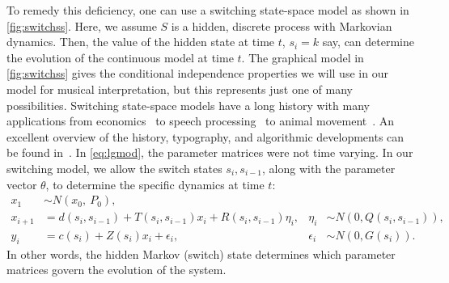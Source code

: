 \documentclass[12pt]{article}
\begin{document}
To remedy this deficiency, one can use a switching state-space
model as shown in \autoref{fig:switchss}. Here, we assume $S$ is a
hidden, discrete process with Markovian dynamics. Then, the value of
the hidden state at time $t$, $s_i=k$ say, can determine the evolution of
the continuous model at time $t$. The graphical model in
\autoref{fig:switchss} gives the conditional independence properties
we will use in our model for musical interpretation, but this
represents just one of many possibilities. Switching state-space models have a long
history with many applications from
economics~\citep{KimNelson1998,Kim1994,Hamilton2011} to speech
processing~\citep{FoxSudderth2011} to animal
movement~\citep{PattersonThomas2008,BlockJonsen2011}. An excellent
overview of the history, typography, and algorithmic developments can
be found in~\citep{GhahramaniHinton2000}. In \eqref{eq:lgmod}, the
parameter matrices were not time varying. In our switching model, we
allow the switch states $s_i, s_{i-1}$, along with the parameter
vector $\theta$, to determine the specific dynamics at time $t$:
\begin{equation}
  \begin{aligned}
    x_1 &\sim N(x_0,\ P_0),\\
    x_{i+1}&= d(s_i,s_{i-1})+T(s_i,s_{i-1}) x_i +
    R(s_i,s_{i-1})\eta_i, 
    & \eta_i &\sim N(0,Q(s_i,s_{i-1})),\\
    y_i&= c(s_i) + Z(s_i) x_i + \epsilon_i, & \epsilon_i &\sim N(0, G(s_i)).
  \end{aligned}
\end{equation}
In other words, the hidden Markov (switch) state determines which parameter
matrices govern the evolution of the system. 
\end{document}
